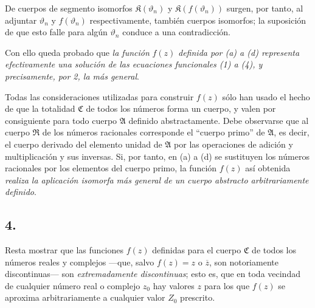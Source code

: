 De cuerpos de segmento isomorfos $\mathfrak K(\vartheta_n)$ y $\mathfrak K(f(\vartheta_n))$ surgen, por tanto, al adjuntar $\vartheta_n$ y $f(\vartheta_n)$ respectivamente, también cuerpos isomorfos; la suposición de que esto falle para algún $\vartheta_n$ conduce a una contradicción.

Con ello queda probado que \emph{la función} $f(z)$ \emph{definida por (a) a (d) representa efectivamente una solución de las ecuaciones funcionales (1) a (4), y precisamente, por 2, la más general}.

Todas las consideraciones utilizadas para construir $f(z)$ sólo han usado el hecho de que la totalidad $\mathfrak C$ de todos los números forma un cuerpo, y valen por consiguiente para todo cuerpo $\mathfrak A$ definido abstractamente. Debe observarse que al cuerpo $\mathfrak R$ de los números racionales corresponde el ``cuerpo primo'' de $\mathfrak A$, es decir, el cuerpo derivado del elemento unidad de $\mathfrak A$ por las operaciones de adición y multiplicación y sus inversas. Si, por tanto, en (a) a (d) se sustituyen los números racionales por los elementos del cuerpo primo, la función $f(z)$ así obtenida \emph{realiza la aplicación isomorfa más general de un cuerpo abstracto arbitrariamente definido}.

\subsection*{4.}

Resta mostrar que las funciones $f(z)$ definidas para el cuerpo $\mathfrak C$ de todos los números reales y complejos ---que, salvo $f(z)=z$ o $\overline z$, son notoriamente discontinuas--- son \emph{extremadamente discontinuas}; esto es, que en toda vecindad de cualquier número real o complejo $z_0$ hay valores $z$ para los que $f(z)$ se aproxima arbitrariamente a cualquier valor $Z_0$ prescrito.

